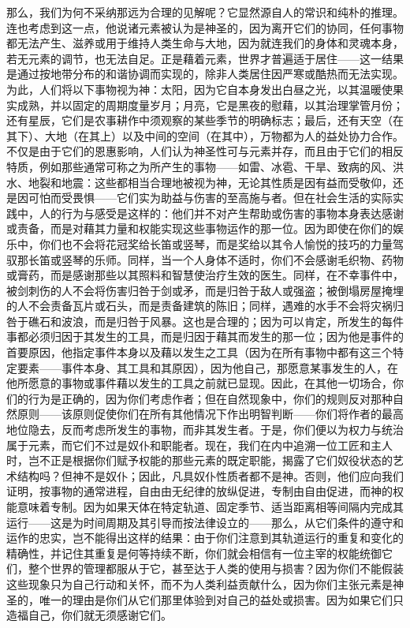 那么，我们为何不采纳那远为合理的见解呢？它显然源自人的常识和纯朴的推理。连也考虑到这一点，他说诸元素被认为是神圣的，因为离开它们的协同，任何事物都无法产生、滋养或用于维持人类生命与大地，因为就连我们的身体和灵魂本身，若无元素的调节，也无法自足。正是藉着元素，世界才普遍适于居住——这一结果是通过按地带分布的和谐协调而实现的，除非人类居住因严寒或酷热而无法实现。为此，人们将以下事物视为神：太阳，因为它自本身发出白昼之光，以其温暖使果实成熟，并以固定的周期度量岁月；月亮，它是黑夜的慰藉，以其治理掌管月份；还有星辰，它们是农事耕作中须观察的某些季节的明确标志；最后，还有天空（在其下）、大地（在其上）以及中间的空间（在其中），万物都为人的益处协力合作。不仅是由于它们的恩惠影响，人们认为神圣性可与元素并存，而且由于它们的相反特质，例如那些通常可称之为所产生的事物——如雷、冰雹、干旱、致病的风、洪水、地裂和地震：这些都相当合理地被视为神，无论其性质是因有益而受敬仰，还是因可怕而受畏惧——它们实为助益与伤害的至高施与者。但在社会生活的实际实践中，人的行为与感受是这样的：他们并不对产生帮助或伤害的事物本身表达感谢或责备，而是对藉其力量和权能实现这些事物运作的那一位。因为即使在你们的娱乐中，你们也不会将花冠奖给长笛或竖琴，而是奖给以其令人愉悦的技巧的力量驾驭那长笛或竖琴的乐师。同样，当一个人身体不适时，你们不会感谢毛织物、药物或膏药，而是感谢那些以其照料和智慧使治疗生效的医生。同样，在不幸事件中，被剑刺伤的人不会将伤害归咎于剑或矛，而是归咎于敌人或强盗；被倒塌房屋掩埋的人不会责备瓦片或石头，而是责备建筑的陈旧；同样，遇难的水手不会将灾祸归咎于礁石和波浪，而是归咎于风暴。这也是合理的；因为可以肯定，所发生的每件事都必须归因于其发生的工具，而是归因于藉其而发生的那一位；因为他是事件的首要原因，他指定事件本身以及藉以发生之工具（因为在所有事物中都有这三个特定要素——事件本身、其工具和其原因），因为他自己，那愿意某事发生的人，在他所愿意的事物或事件藉以发生的工具之前就已显现。因此，在其他一切场合，你们的行为是正确的，因为你们考虑作者；但在自然现象中，你们的规则反对那种自然原则——该原则促使你们在所有其他情况下作出明智判断——你们将作者的最高地位隐去，反而考虑所发生的事物，而非其发生者。于是，你们便以为权力与统治属于元素，而它们不过是奴仆和职能者。现在，我们在内中追溯一位工匠和主人时，岂不正是根据你们赋予权能的那些元素的既定职能，揭露了它们奴役状态的艺术结构吗？但神不是奴仆；因此，凡具奴仆性质者都不是神。否则，他们应向我们证明，按事物的通常进程，自由由无纪律的放纵促进，专制由自由促进，而神的权能意味着专制。因为如果天体在特定轨道、固定季节、适当距离相等间隔内完成其运行——这是为时间周期及其引导而按法律设立的——那么，从它们条件的遵守和运作的忠实，岂不能得出这样的结果：由于你们注意到其轨道运行的重复和变化的精确性，并记住其重复是何等持续不断，你们就会相信有一位主宰的权能统御它们，整个世界的管理都服从于它，甚至达于人类的使用与损害？因为你们不能假装这些现象只为自己行动和关怀，而不为人类利益贡献什么，因为你们主张元素是神圣的，唯一的理由是你们从它们那里体验到对自己的益处或损害。因为如果它们只造福自己，你们就无须感谢它们。\par

